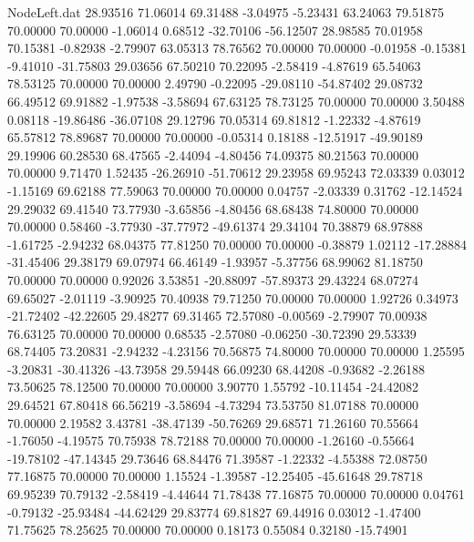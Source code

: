 \begin{filecontents}{NodeLeft.dat}
  28.93516   71.06014   69.31488    -3.04975   -5.23431   63.24063   79.51875   70.00000   70.00000   -1.06014    0.68512  -32.70106  -56.12507
  28.98585   70.01958   70.15381    -0.82938   -2.79907   63.05313   78.76562   70.00000   70.00000   -0.01958   -0.15381   -9.41010  -31.75803
  29.03656   67.50210   70.22095    -2.58419   -4.87619   65.54063   78.53125   70.00000   70.00000    2.49790   -0.22095  -29.08110  -54.87402
  29.08732   66.49512   69.91882    -1.97538   -3.58694   67.63125   78.73125   70.00000   70.00000    3.50488    0.08118  -19.86486  -36.07108
  29.12796   70.05314   69.81812    -1.22332   -4.87619   65.57812   78.89687   70.00000   70.00000   -0.05314    0.18188  -12.51917  -49.90189
  29.19906   60.28530   68.47565    -2.44094   -4.80456   74.09375   80.21563   70.00000   70.00000    9.71470    1.52435  -26.26910  -51.70612
  29.23958   69.95243   72.03339     0.03012   -1.15169   69.62188   77.59063   70.00000   70.00000    0.04757   -2.03339    0.31762  -12.14524
  29.29032   69.41540   73.77930    -3.65856   -4.80456   68.68438   74.80000   70.00000   70.00000    0.58460   -3.77930  -37.77972  -49.61374
  29.34104   70.38879   68.97888    -1.61725   -2.94232   68.04375   77.81250   70.00000   70.00000   -0.38879    1.02112  -17.28884  -31.45406
  29.38179   69.07974   66.46149    -1.93957   -5.37756   68.99062   81.18750   70.00000   70.00000    0.92026    3.53851  -20.88097  -57.89373
  29.43224   68.07274   69.65027    -2.01119   -3.90925   70.40938   79.71250   70.00000   70.00000    1.92726    0.34973  -21.72402  -42.22605
  29.48277   69.31465   72.57080    -0.00569   -2.79907   70.00938   76.63125   70.00000   70.00000    0.68535   -2.57080   -0.06250  -30.72390
  29.53339   68.74405   73.20831    -2.94232   -4.23156   70.56875   74.80000   70.00000   70.00000    1.25595   -3.20831  -30.41326  -43.73958
  29.59448   66.09230   68.44208    -0.93682   -2.26188   73.50625   78.12500   70.00000   70.00000    3.90770    1.55792  -10.11454  -24.42082
  29.64521   67.80418   66.56219    -3.58694   -4.73294   73.53750   81.07188   70.00000   70.00000    2.19582    3.43781  -38.47139  -50.76269
  29.68571   71.26160   70.55664    -1.76050   -4.19575   70.75938   78.72188   70.00000   70.00000   -1.26160   -0.55664  -19.78102  -47.14345
  29.73646   68.84476   71.39587    -1.22332   -4.55388   72.08750   77.16875   70.00000   70.00000    1.15524   -1.39587  -12.25405  -45.61648
  29.78718   69.95239   70.79132    -2.58419   -4.44644   71.78438   77.16875   70.00000   70.00000    0.04761   -0.79132  -25.93484  -44.62429
  29.83774   69.81827   69.44916     0.03012   -1.47400   71.75625   78.25625   70.00000   70.00000    0.18173    0.55084    0.32180  -15.74901

\end{filecontents}

